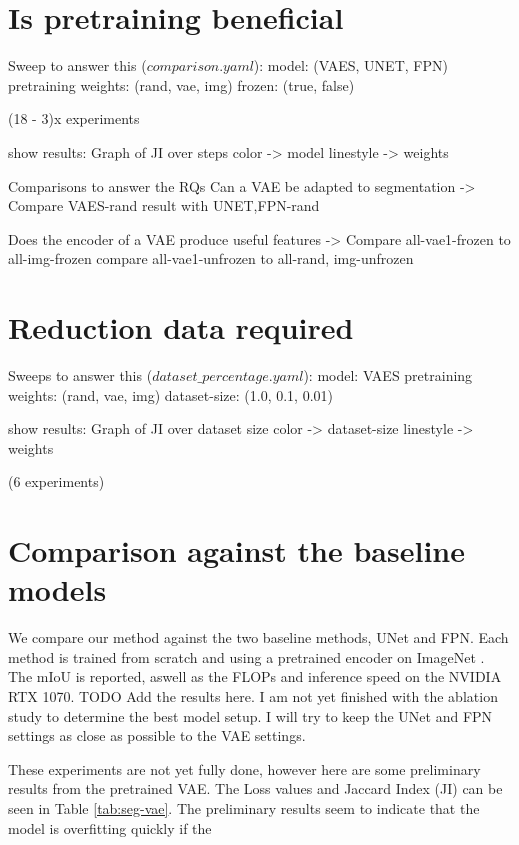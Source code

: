 \section{Is pretraining beneficial}

Sweep to answer this ($comparison.yaml$):
model: (VAES, UNET, FPN)
pretraining weights: (rand, vae, img)
frozen: (true, false)

(18 - 3)x experiments

show results:
Graph of JI over steps
color -> model
linestyle -> weights

Comparisons to answer the RQs
Can a VAE be adapted to segmentation 
->
Compare VAES-rand result with {UNET,FPN}-rand

Does the encoder of a VAE produce useful features
->
Compare {all}-vae1-frozen to {all}-img-frozen
compare {all}-vae1-unfrozen to {all}-{rand, img}-unfrozen


\section{Reduction data required}

Sweeps to answer this ($dataset\_percentage.yaml$):
model: VAES
pretraining weights: (rand, vae, img)
dataset-size: (1.0, 0.1, 0.01)

show results:
Graph of JI over dataset size
color -> dataset-size
linestyle -> weights

(6 experiments)


\section{Comparison against the baseline models}
We compare our method against the two baseline methods, UNet and FPN. Each method is trained from scratch and using a pretrained encoder on ImageNet \cite{deng2009imagenet}. The mIoU is reported, aswell as the FLOPs and inference speed on the NVIDIA RTX 1070. 
TODO Add the results here. I am not yet finished with the ablation study to determine the best model setup. I will try to keep the UNet and FPN settings as close as possible to the VAE settings.

These experiments are not yet fully done, however here are some preliminary results from the pretrained VAE. The Loss values and Jaccard Index (JI) can be seen in Table \ref{tab:seg-vae}. The preliminary results seem to indicate that the model is overfitting quickly if the 

